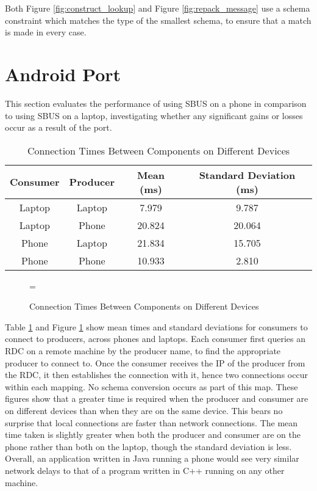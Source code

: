 \documentclass[12pt,twoside,notitlepage]{report}
\begin{document}
Both Figure \ref{fig:construct_lookup} and Figure \ref{fig:repack_message} use a schema constraint which matches the type of the smallest schema, to ensure that a match is made in every case. 

\section{Android Port}

This section evaluates the performance of using SBUS on a phone in comparison to using SBUS on a laptop, investigating whether any significant gains or losses occur as a result of the port.

\begin{table}[h]
\centering

\begin{tabular}{c c c c}
\hline\hline

Consumer & Producer & Mean (ms) & Standard Deviation (ms) \\
\hline

Laptop	&	Laptop	& 7.979 	& 9.787 \\
Laptop	&	Phone	& 20.824 	& 20.064 \\
Phone	&	Laptop	& 21.834	& 15.705 \\
Phone	& 	Phone	& 10.933	& 2.810 \\
\hline
\end{tabular}

\caption{Connection Times Between Components on Different Devices}
\label{tab:map_times}
\end{table}

\begin{figure}[t]
\epsfxsize=\hsize
\centerline{}
\caption{Connection Times Between Components on Different Devices}
\label{fig:map_times}
\end{figure}

Table \ref{tab:map_times} and Figure \ref{fig:map_times} show mean times and standard deviations for consumers to connect to producers, across phones and laptops.
Each consumer first queries an RDC on a remote machine by the producer name, to find the appropriate producer to connect to. 
Once the consumer receives the IP of the producer from the RDC, it then establishes the connection with it, hence two connections occur within each mapping. 
No schema conversion occurs as part of this map. 
These figures show that a greater time is required when the producer and consumer are on different devices than when they are on the same device. 
This bears no surprise that local connections are faster than network connections. 
The mean time taken is slightly greater when both the producer and consumer are on the phone rather than both on the laptop, though the standard deviation is less. 
Overall, an application written in Java running a phone would see very similar network delays to that of a program written in C++ running on any other machine.
\end{document}
